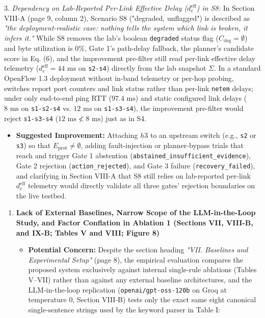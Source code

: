\documentclass[11pt,a4paper]{article}
\begin{document}
3. \emph{Dependency on Lab-Reported Per-Link Effective Delay ($d_e^{\text{eff}}$) in S8:} In Section VIII-A (page 9, column 2), Scenario S8 ("degraded, unflagged") is described as \emph{"the deployment-realistic case: nothing tells the system which link is broken, it infers it."} While S8 removes the lab's boolean \texttt{degraded} status flag ($C_{\text{deg}} = \emptyset$) and byte utilization is $0\%$, Gate 1's path-delay fallback, the planner's candidate score in Eq. (6), and the improvement pre-filter still read per-link effective delay telemetry ($d_e^{\text{eff}} = 44\text{ ms}$ on \texttt{s2-s4}) directly from the lab snapshot $\Sigma$. In a standard OpenFlow 1.3 deployment without in-band telemetry or per-hop probing, switches report port counters and link status rather than per-link \texttt{netem} delays; under only end-to-end ping RTT ($97.4\text{ ms}$) and static configured link delays ($8\text{ ms}$ on \texttt{s1-s2-s4} vs. $12\text{ ms}$ on \texttt{s1-s3-s4}), the improvement pre-filter would reject \texttt{s1-s3-s4} ($12\text{ ms} \not< 8\text{ ms}$) just as in S4.
\begin{itemize}[leftmargin=1.8em,itemsep=2pt]
\item \textbf{Suggested Improvement:} Attaching $h3$ to an upstream switch (e.g., \texttt{s2} or \texttt{s3}) so that $E_{\text{prot}} \neq \emptyset$, adding fault-injection or planner-bypass trials that reach and trigger Gate 1 abstention (\texttt{abstained\_insufficient\_evidence}), Gate 2 rejection (\texttt{action\_rejected}), and Gate 3 failure (\texttt{recovery\_failed}), and clarifying in Section VIII-A that S8 still relies on lab-reported per-link $d_e^{\text{eff}}$ telemetry would directly validate all three gates' rejection boundaries on the live testbed.
\end{itemize}
\begin{enumerate}[leftmargin=1.6em,itemsep=3pt]
\item \textbf{Lack of External Baselines, Narrow Scope of the LLM-in-the-Loop Study, and Factor Conflation in Ablation 1 (Sections VII, VIII-B, and IX-B; Tables V and VIII; Figure 8)}
\begin{itemize}[leftmargin=1.8em,itemsep=2pt]
\item \textbf{Potential Concern:} Despite the section heading \emph{"VII. Baselines and Experimental Setup"} (page 8), the empirical evaluation compares the proposed system exclusively against internal single-rule ablations (Tables V–VII) rather than against any external baseline architectures, and the LLM-in-the-loop replication (\texttt{openai/gpt-oss-120b} on Groq at temperature 0, Section VIII-B) tests only the exact same eight canonical single-sentence strings used by the keyword parser in Table I:
\end{itemize}
\end{enumerate}
\end{document}
